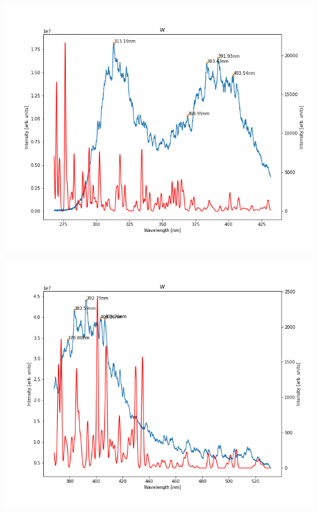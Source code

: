 \documentclass{beamer}
\begin{document}
\begin{frame}
    \includegraphics[scale=0.45]{W/350nm.png}
\end{frame}

\begin{frame}
    \includegraphics[scale=0.45]{W/450nm.png}
\end{frame}
\end{document}
